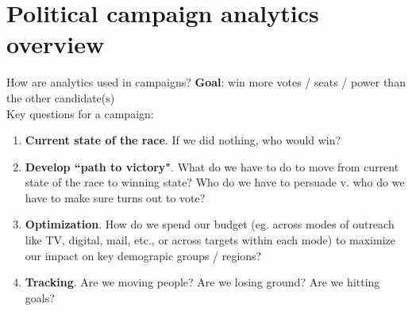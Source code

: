 \documentclass[ignorenonframetext,]{beamer}
\begin{document}
\section{Political campaign analytics overview}

\begin{frame}{How are analytics used in campaigns?}
\textbf{Goal}: win more votes / seats / power than the other candidate(s)\\

\pause
Key questions for a campaign:
\pause
\begin{enumerate}
	\item<2-> \textbf{Current state of the race}. If we did nothing, who would win?
	\item<3-> \textbf{Develop ``path to victory"}. What do we have to do to move from current state of the race to winning state? Who do we have to persuade v. who do we have to make sure turns out to vote?
	\item<4-> \textbf{Optimization}.  How do we spend our budget (eg. across modes of outreach like TV, digital, mail, etc., or across targets within each mode) to maximize our impact on key demograpic groups / regions?
	\item<5-> \textbf{Tracking}.  Are we moving people?  Are we losing ground? Are we hitting goals?
\end{enumerate}
\end{frame}
\end{document}
